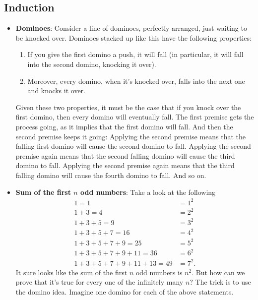 \documentclass{report}
\begin{document}
    \subsection{Induction}
    \begin{itemize}
        \item \textbf{Dominoes}: Consider a line of dominoes, perfectly arranged, just waiting to be knocked over. Dominoes stacked up like this have the following properties:
            \begin{enumerate}
                \item If you give the first domino a push, it will fall (in particular, it will fall into the second domino, knocking it over).
                \item Moreover, every domino, when it’s knocked over, falls into the next one and knocks it over.
            \end{enumerate}
            Given these two properties, it must be the case that if you knock over the first domino, then every domino will eventually fall. The first premise gets the process going, as it implies that the first domino will fall. And then the second premise keeps it going: Applying the second premise means that the falling first domino will cause the second domino to fall. Applying the second premise again means that the second falling domino will cause the third domino to fall. Applying the second premise again means that the third falling domino will cause the fourth domino to fall. And so on.
        \item \textbf{Sum of the first $n$  odd numbers}: Take a look at the following
            \begin{align*}
                1 = 1 &= 1^{2} \\
                1 + 3 = 4 &= 2^{2}\\
                1 + 3 + 5 = 9 &= 3^{2}\\
                1 + 3 + 5 + 7 = 16 &= 4^{2}\\
                1 + 3 + 5 + 7 + 9 = 25 &= 5^{2}\\
                1 + 3 + 5 + 7 + 9 + 11 = 36 &= 6^{2}\\
                1 + 3 + 5 + 7 + 9 + 11 + 13 = 49 &= 7^{2}
            .\end{align*}
            \bigbreak \noindent 
            It sure looks like the sum of the first $n$ odd numbers is $n^{2}$. But how can we prove that it’s true for every one of the infinitely many $n$? The trick is to use the domino idea. Imagine one domino for each of the above statements.

\end{itemize}
\end{document}
